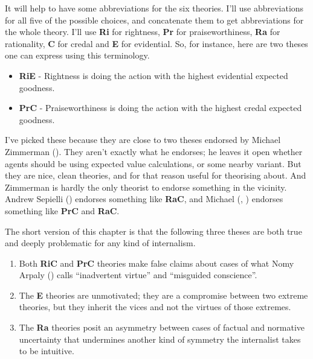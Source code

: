 \documentclass[
  10pt,
  letterpaper,
  twoside]{scrbook}
\providecommand{\tightlist}{%
  \setlength{\itemsep}{0pt}\setlength{\parskip}{0pt}}\usepackage{longtable,booktabs,array}
\begin{document}
It will help to have some abbreviations for the six theories. I'll use
abbreviations for all five of the possible choices, and concatenate them
to get abbreviations for the whole theory. I'll use \textbf{Ri} for
rightness, \textbf{Pr} for praiseworthiness, \textbf{Ra} for
rationality, \textbf{C} for credal and \textbf{E} for evidential. So,
for instance, here are two theses one can express using this
terminology.

\begin{itemize}
\tightlist
\item
  \textbf{RiE} - Rightness is doing the action with the highest
  evidential expected goodness.
\item
  \textbf{PrC} - Praiseworthiness is doing the action with the highest
  credal expected goodness.
\end{itemize}

I've picked these because they are close to two theses endorsed by
Michael Zimmerman (). They aren't
exactly what he endorses; he leaves it open whether agents should be
using expected value calculations, or some nearby variant. But they are
nice, clean theories, and for that reason useful for theorising about.
And Zimmerman is hardly the only theorist to endorse something in the
vicinity. Andrew Sepielli () endorses
something like \textbf{RaC}, and Michael (, ) endorses something like
\textbf{PrC} and \textbf{RaC}.

The short version of this chapter is that the following three theses are
both true and deeply problematic for any kind of internalism.

\begin{enumerate}
\def\labelenumi{\arabic{enumi}.}
\tightlist
\item
  Both \textbf{RiC} and \textbf{PrC} theories make false claims about
  cases of what Nomy Arpaly () calls
  ``inadvertent virtue'' and ``misguided conscience''.
\item
  The \textbf{E} theories are unmotivated; they are a compromise between
  two extreme theories, but they inherit the vices and not the virtues
  of those extremes.
\item
  The \textbf{Ra} theories posit an asymmetry between cases of factual
  and normative uncertainty that undermines another kind of symmetry the
  internalist takes to be intuitive.
\end{enumerate}
\end{document}
